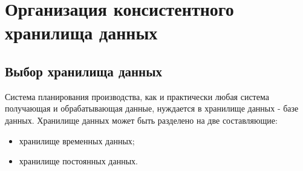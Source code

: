 \chapter{Организация консистентного хранилища данных}

\section*{Выбор хранилища данных}

\indent Система планирования производства, как и практически любая система получающая и обрабатывающая данные, нуждается в хранилище данных - базе данных.
Хранилище данных может быть разделено на две составляющие:
\begin{itemize}
	\item хранилище временных данных;
	\item хранилище постоянных данных.
\end{itemize}

